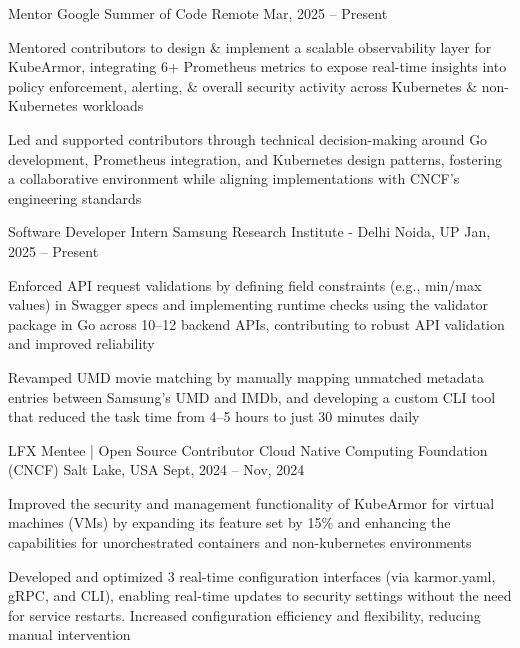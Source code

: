 \documentclass[]{awesome-cv}
\begin{document}
\vspace{-3mm}
\begin{cventries}
    \vspace{-1mm}
    \cventry
    {Mentor}
    {Google Summer of Code}
    {Remote}
    {Mar, 2025 – Present}
    {\begin{cvitems}
        \item Mentored contributors to design \& implement a scalable observability layer for KubeArmor, integrating 6+ Prometheus metrics to expose real-time insights into policy enforcement, alerting, \& overall security activity across Kubernetes \& non-Kubernetes workloads
        \item Led and supported contributors through technical decision-making around Go development, Prometheus integration, and Kubernetes design patterns, fostering a collaborative environment while aligning implementations with CNCF’s engineering standards
        \end{cvitems}}
    \cventry
    {Software Developer Intern}
    {Samsung Research Institute - Delhi}
    {Noida, UP}
    {Jan, 2025 – Present}
    {\begin{cvitems}
        \item Enforced API request validations by defining field constraints (e.g., min/max values) in Swagger specs and implementing runtime checks using the validator package in Go across 10–12 backend APIs, contributing to robust API validation and improved reliability
        \item Revamped UMD movie matching by manually mapping unmatched metadata entries between Samsung’s UMD and IMDb, and developing a custom CLI tool that reduced the task time from 4–5 hours to just 30 minutes daily
        \end{cvitems}}
    \cventry
    {LFX Mentee | Open Source Contributor}
    {Cloud Native Computing Foundation (CNCF)}
    {Salt Lake, USA}
    {Sept, 2024 – Nov, 2024}
    {\begin{cvitems}
        \item Improved the security and management functionality of KubeArmor for virtual machines (VMs) by expanding its feature set by 15\% and enhancing the capabilities for unorchestrated containers and non-kubernetes environments
        \item Developed and optimized 3 real-time configuration interfaces (via karmor.yaml, gRPC, and CLI), enabling real-time updates to security settings without the need for service restarts. Increased configuration efficiency and flexibility, reducing manual intervention

\end{cvitems}}
\end{cventries}
\end{document}
